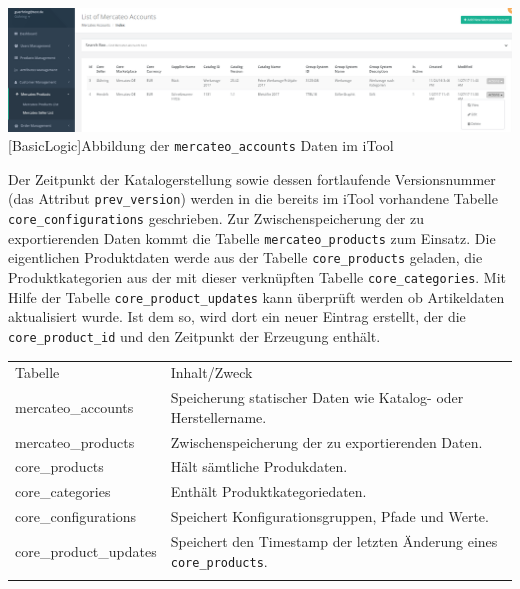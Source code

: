 	\begin{minipage}{\linewidth}
		\vspace{1em}
		\centering
		\includegraphics[width=1 \linewidth]{img/iToolSeller}
		[BasicLogic]{Abbildung der \texttt{mercateo\_accounts} Daten im iTool}
		\vspace{1em}
	\end{minipage}
	
	 Der Zeitpunkt der Katalogerstellung sowie dessen fortlaufende Versionsnummer (das Attribut \texttt{prev\_version}) werden in die bereits im iTool vorhandene Tabelle \texttt{core\_configurations} geschrieben. Zur Zwischenspeicherung der zu exportierenden Daten kommt die Tabelle \texttt{mercateo\_products} zum Einsatz. Die eigentlichen Produktdaten werde aus der Tabelle \texttt{core\_products} geladen, die Produktkategorien aus der mit dieser verknüpften Tabelle \texttt{core\_categories}. Mit Hilfe der Tabelle \texttt{core\_product\_updates} kann überprüft werden ob Artikeldaten aktualisiert wurde. Ist dem so, wird dort ein neuer Eintrag erstellt, der die \texttt{core\_product\_id} und den Zeitpunkt der Erzeugung enthält.
	

	
	
	\begin{table}[!htbp]
		\begin{tabularx}{\textwidth}{p{3.8cm} X  }
			\rowcolor[HTML]{EFEFEF} 
			Tabelle & Inhalt/Zweck  \\ \cline{1-2} \addlinespace[7pt]
			mercateo\_accounts & Speicherung statischer Daten wie Katalog- oder Herstellername. \\
			mercateo\_products & Zwischenspeicherung der zu exportierenden Daten.  \\
			core\_products & Hält sämtliche Produkdaten. \\
			core\_categories & Enthält Produktkategoriedaten. \\
			core\_configurations & Speichert Konfigurationsgruppen, Pfade und Werte. \\ 
			core\_product\_updates & Speichert den Timestamp der letzten Änderung eines \texttt{core\_products}. \\ \addlinespace[7pt] \cline{1-2} 	
	
		\end{tabularx}%
	\end{table}
		
